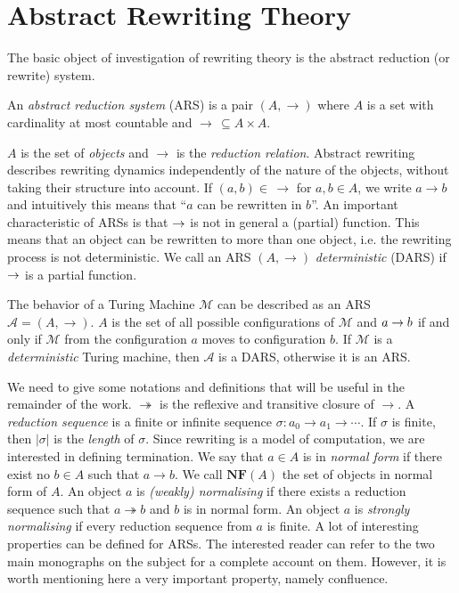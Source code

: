 \section{Abstract Rewriting Theory}
The basic object of investigation of rewriting theory is the abstract reduction (or rewrite) system. 
\begin{definition}[ARS]
	An \emph{abstract reduction system} (ARS) is a pair $(A,\rightarrow)$ where $A$ is a set with cardinality at most countable and $\rightarrow\,\subseteq A\times A$.
\end{definition}
$A$ is the set of \emph{objects} and $\rightarrow$ is the \emph{reduction relation}. Abstract rewriting describes rewriting dynamics independently of the nature of the objects, without taking their structure into account. If $(a,b)\in\,\rightarrow$ for $a,b\in A$, we write $a\rightarrow b$ and intuitively this means that ``$a$ can be rewritten in $b$''. An important characteristic of ARSs is that $\rightarrow$ is not in general a (partial) function. This means that an object can be rewritten to more than one object, i.e. the rewriting process is not deterministic. We call an ARS $(A,\rightarrow)$ \emph{deterministic} (DARS) if $\rightarrow$ is a partial function.
\begin{example}
	The behavior of a Turing Machine $\mathcal{M}$ can be described as an ARS $\mathcal{A}=(A,\rightarrow)$. $A$ is the set of all possible configurations of $\mathcal{M}$ and $a\rightarrow b$ if and only if $\mathcal{M}$ from the configuration $a$ moves to configuration $b$. If $\mathcal{M}$ is a \emph{deterministic} Turing machine, then $\mathcal{A}$ is a DARS, otherwise it is an ARS.
\end{example}
We need to give some notations and definitions that will be useful in the remainder of the work. $\twoheadrightarrow$ is the reflexive and transitive closure of $\rightarrow$. A \emph{reduction sequence} is a finite or infinite sequence $\sigma:a_0\rightarrow a_1\rightarrow\cdots$. If $\sigma$ is finite, then $|\sigma|$ is the \emph{length} of $\sigma$. Since rewriting is a model of computation, we are interested in defining termination. We say that $a\in A$ is in \emph{normal form} if there exist no $b\in A$ such that $a\rightarrow b$. We call $\mathbf{NF}(A)$ the set of objects in normal form of $A$. An object $a$ is \emph{(weakly) normalising} if there exists a reduction sequence such that $a\twoheadrightarrow b$ and $b$ is in normal form. An object $a$ is \emph{strongly normalising} if every reduction sequence from $a$ is finite.  A lot of interesting properties can be defined for ARSs. The interested reader can refer to the two main monographs on the subject \cite{terese_term_2003,baader_term_1999} for a complete account on them. However, it is worth mentioning here a very important property, namely confluence.
